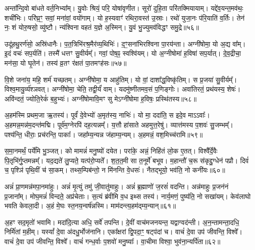 अन्ता᳚न्दि॒वो बा॑धते वर्त॒निभ्या᳚म्।
यु॒वोः श्रियं॒ परि॒ योषा॑वृणीत।
सूरो॑ दुहि॒ता परि॑तक्मियायाम्।
यद्दे॑व॒यन्त॒मव॑थः॒ शची॑भिः।
परि॑घ्र॒ꣳ॒ सवां॒ मना॑वां॒ वयो॑गाम्।
यो ह॒स्यवाꣳ॑ रथिरा॒वस्त॑ उ॒स्राः।
रथो॑ युजा॒नः प॑रि॒याति॑ व॒र्तिः।
तेन॑ नः॒ शं योरु॒षसो॒ व्यु॑ष्टौ।
न्य॑श्विना वहतं य॒ज्ञे अ॒स्मिन्।
यु॒वं भु॒ज्युमव॑विद्धꣳ समु॒द्रे॥५६॥

उदू॑हथु॒रर्ण॑सो॒ अस्रि॑धानैः।
प॒त॒त्रिभि॑रश्र॒मैर॑व्य॒थिभिः॑।
द॒ꣳ॒सना॑भिरश्विना पा॒रय॑न्ता।
अग्नी॑षोमा॒ यो अ॒द्य वा᳚म्।
इ॒दं वचः॑ सप॒र्यति॑।
तस्मै॑ धत्तꣳ सु॒वीर्यम्᳚।
गवां॒ पोष॒ꣴ॒ स्वश्वि॑यम्।
यो अ॒ग्नीषोमा॑ ह॒विषा॑ सप॒र्यात्।
दे॒व॒द्रीचा॒ मन॑सा॒ यो घृ॒तेन॑।
तस्य॑ व्र॒तꣳ र॑क्षतं पा॒तमꣳह॑सः॥५७॥

वि॒शे जना॑य॒ महि॒ शर्म॑ यच्छतम्।
अग्नी॑षोमा॒ य आहु॑तिम्।
यो वां॒ दाशा᳚द्ध॒विष्कृ॑तिम्।
स प्र॒जया॑ सु॒वीर्यम्᳚।
विश्व॒मायु॒र्व्य॑श्ञवत्।
अग्नी॑षोमा॒ चेति॒ तद्वी॒र्यं॑ वाम्।
यदमु॑ष्णीतमव॒सं प॒णिङ्गोः।
अवा॑तिरतं॒ प्रथ॑यस्य॒ शेषः॑।
अवि॑न्दतं॒ ज्योति॒रेकं॑ ब॒हुभ्यः॑।
अग्नी॑षोमावि॒मꣳ सु मेऽग्नी॑षोमा ह॒विषः॒ प्रस्थि॑तस्य॥५८॥\anuvakamend[ज॒भा॒र॒ द्यौर॒ग्नेरु॒पस्थ॑ उप॒क्ष्यन्तो॑ बद्बधा॒नो व॒ध्वा॑ याद॑मानः समु॒द्रे\-ऽꣳह॑सः॒ प्रस्थि॑तस्य]

अ॒हम॑स्मि प्रथम॒जा ऋ॒तस्य॑।
पूर्वं॑ दे॒वेभ्यो॑ अ॒मृत॑स्य॒ नाभिः॑।
यो मा॒ ददा॑ति॒ स इदे॒व माऽऽवाः᳚।
अ॒हमन्न॒मन्न॑\-म॒दन्त॑\-मद्मि।
पूर्व॑म॒ग्नेरपि॑ दह॒त्यन्नम्᳚।
य॒त्तौ हा॑साते अहमुत्त॒रेषु॑।
व्यात्त॑मस्य प॒शवः॑ सु॒जम्भम्᳚।
पश्य॑न्ति॒ धीराः॒ प्रच॑रन्ति॒ पाकाः᳚।
जहा᳚म्य॒न्यन्न ज॑हाम्य॒न्यम्।
अ॒हमन्नं॒ वश॒मिच्च॑रामि॥५९॥

स॒मा॒नमर्थं॒ पर्ये॑मि भु॒ञ्जत्।
को मामन्नं॑ मनु॒ष्यो॑ दयेत।
परा॑के॒ अन्नं॒ निहि॑तं लो॒क ए॒तत्।
विश्वै᳚र्दे॒वैः पि॒तृभि॑र्गु॒प्तमन्नम्᳚।
यद॒द्यते॑ लु॒प्यते॒ यत्प॑रो॒प्यते᳚।
श॒त॒त॒मी सा त॒नूर्मे॑ बभूव।
म॒हान्तौ॑ च॒रू स॑कृद्दु॒ग्धेन॑ पप्रौ।
दिवं॑ च॒ पृश्ञि॑ पृथि॒वीं च॑ सा॒कम्।
तथ्स॒म्पिब॑न्तो॒ न मि॑नन्ति वे॒धसः॑।
नैतद्भूयो॒ भव॑ति॒ नो कनी॑यः॥६०॥

अन्नं॑ प्रा॒णमन्न॑मपा॒नमा॑हुः।
अन्नं॑ मृ॒त्युं तमु॑ जी॒वातु॑माहुः।
अन्नं॑ ब्र॒ह्माणो॑ ज॒रसं॑  वदन्ति।
अन्न॑माहुः प्र॒जन॑नं प्र॒जाना᳚म्।
मोघ॒मन्नं॑ विन्दते॒ अप्र॑चेताः।
स॒त्यं ब्र॑वीमि व॒ध इथ्स तस्य॑।
नार्य॒मणं॒ पुष्य॑ति॒ नो सखा॑यम्।
केव॑लाघो भवति केवला॒दी।
अ॒हं मे॒घः स्त॒नय॒न्वर्\mbox{}ष॑न्नस्मि।
माम॑दन्त्य॒हम॑द्म्य॒न्यान्॥६१॥

अ॒हꣳ सद॒मृतो॑ भवामि।
मदा॑दि॒त्या अधि॒ सर्वे॑ तपन्ति।
दे॒वीं वाच॑मजनयन्त॒ यद्वाग्वद॑न्ती।
अ॒न॒न्तामन्ता॒दधि॒ निर्मि॑तां म॒हीम्।
यस्यां᳚ दे॒वा अ॑दधु॒र्भोज॑नानि।
एका᳚क्षरां द्वि॒पदा॒ꣳ॒ षट्प॑दां च।
वाचं॑ दे॒वा उप॑ जीवन्ति॒ विश्वे᳚।
वाचं॑ दे॒वा उप॑ जीवन्ति॒ विश्वे᳚।
वाचं॑ गन्ध॒र्वाः प॒शवो॑ मनु॒ष्याः᳚।
वा॒चीमा विश्वा॒ भुव॑ना॒न्यर्पि॑ता॥६२॥

